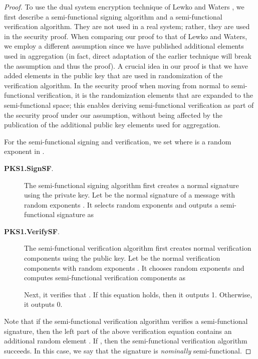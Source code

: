 \documentclass[11pt,letterpaper]{article}
\begin{document}
\begin{proof}
To use the dual system encryption technique of Lewko and Waters
\cite{LewkoW10}, we first describe a semi-functional signing algorithm and a
semi-functional verification algorithm. They are not used in a real system;
rather, they are used in the security proof.
When comparing our proof to that of Lewko and Waters, we employ a different
assumption since we have published additional elements  used in
aggregation (in fact, direct adaptation of the earlier technique will break
the assumption and thus the proof). A crucial idea in our proof is that we
have added elements  in the public
key that are used in randomization of the verification algorithm. In the
security proof when moving from normal to semi-functional verification, it is
the randomization elements  that
are expanded to the semi-functional space; this enables deriving
semi-functional verification as part of the security proof under our
assumption, without being affected by the publication of the additional
public key elements used for aggregation.

For the semi-functional signing and verification, we set  where  is a random exponent in .

\begin{description}
\item [\textbf{PKS1.SignSF}.] The semi-functional signing algorithm first
    creates a normal signature using the private key. Let  be the normal signature of a message  with random
    exponents . It selects random exponents  and outputs a semi-functional signature as
    

\item [\textbf{PKS1.VerifySF}.] The semi-functional verification algorithm
    first creates normal verification components using the public key. Let
     be the normal verification components
    with random exponents . It chooses random
    exponents  and computes semi-functional verification
    components as
    
    Next, it verifies that . If
    this equation holds, then it outputs 1. Otherwise, it outputs 0.
\end{description}

\noindent Note that if the semi-functional verification algorithm verifies a
semi-functional signature, then the left part of the above verification
equation contains an additional random element . If , then the semi-functional verification algorithm
succeeds. In this case, we say that the signature is \textit{nominally}
semi-functional.


\end{proof}
\end{document}

